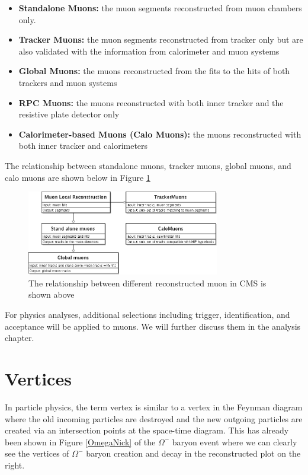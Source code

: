 \begin{itemize}
\item \textbf{Standalone Muons:} the muon segments reconstructed from muon chambers only.
\item \textbf{Tracker Muons:} the muon segments reconstructed from tracker only but are also validated with the information from calorimeter and muon systems
\item \textbf{Global Muons:} the muons reconstructed from the fits to the hits of both trackers and muon systems
\item \textbf{RPC Muons:} the muons reconstructed with both inner tracker and the resistive plate detector only 
\item \textbf{Calorimeter-based Muons (Calo Muons):} the muons reconstructed with both inner tracker and calorimeters  
\end{itemize}

The relationship between standalone muons, tracker muons, global muons, and calo muons are shown below in Figure \ref{MuonRel}

\begin{figure}[hbtp]
\begin{center}
\includegraphics[width=0.75\textwidth]{Figures/Chapter4/MuonRel}
\caption{The relationship between different reconstructed muon in CMS is shown above}
\label{MuonRel}
\end{center}
\end{figure} 

For physics analyses, additional selections including trigger, identification, and acceptance will be applied to muons. We will further discuss them in the analysis chapter.

\section{Vertices}

In particle physics, the term vertex is similar to a vertex in the Feynman diagram where the old incoming particles are destroyed and the new outgoing particles are created via an intersection points at the space-time diagram. This has already been shown in Figure \ref{OmegaNick} of the $\Omega^-$ baryon event where we can clearly see the vertices of $\Omega^-$ baryon creation and decay in the reconstructed plot on the right. 

